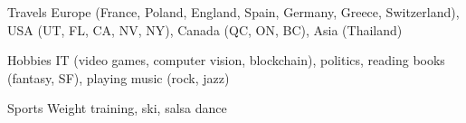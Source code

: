 


\begin{cvskills}


\cvskill
{Travels} %
{Europe (France, Poland, England, Spain, Germany, Greece, Switzerland), USA (UT, FL, CA, NV, NY), Canada (QC, ON, BC), Asia (Thailand)}


\cvskill
{Hobbies} %
{IT (video games, computer vision, blockchain), politics, reading books (fantasy, SF), playing music (rock, jazz)}


\cvskill
{Sports} %
{Weight training, ski, salsa dance}


\end{cvskills}
